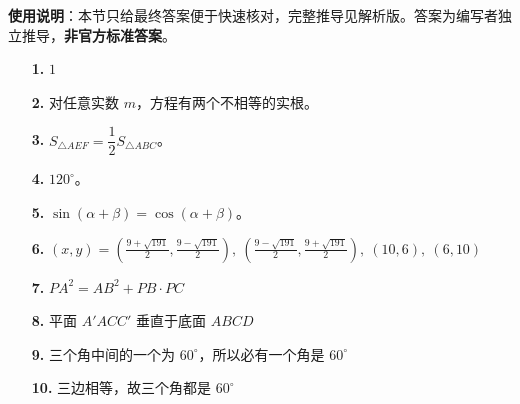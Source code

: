 
\begin{gknotice}
\textbf{使用说明}：本节只给最终答案便于快速核对，完整推导见解析版。答案为编写者独立推导，\textbf{非官方标准答案}。
\end{gknotice}

\begin{itemize}[leftmargin=2.6em]
  \item[\textbf{1.}] $1$
  \item[\textbf{2.}] 对任意实数 $m$，方程有两个不相等的实根。
  \item[\textbf{3.}] $S_{\triangle AEF}=\dfrac12S_{\triangle ABC}$。
  \item[\textbf{4.}] $120^\circ$。
  \item[\textbf{5.}] $\sin(\alpha+\beta)=\cos(\alpha+\beta)$。
\end{itemize}

\begin{itemize}[leftmargin=2.6em]
  \item[\textbf{6.}] $(x,y)=\left(\frac{9+\sqrt{191}}2,\frac{9-\sqrt{191}}2\right),\ \left(\frac{9-\sqrt{191}}2,\frac{9+\sqrt{191}}2\right),\ (10,6),\ (6,10)$
  \item[\textbf{7.}] $PA^2=AB^2+PB\cdot PC$
  \item[\textbf{8.}] 平面 $A'ACC'$ 垂直于底面 $ABCD$
  \item[\textbf{9.}] 三个角中间的一个为 $60^\circ$，所以必有一个角是 $60^\circ$
  \item[\textbf{10.}] 三边相等，故三个角都是 $60^\circ$
\end{itemize}
